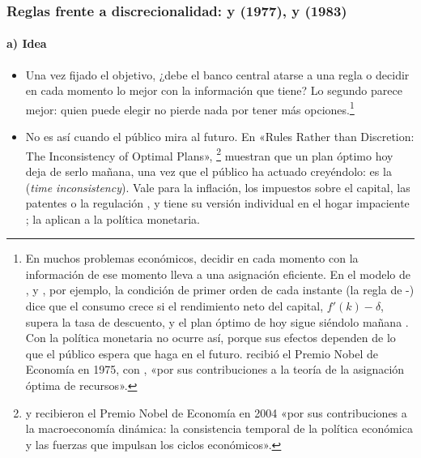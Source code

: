 \documentclass[11pt]{article}
\begin{document}
\subsubsection{Reglas frente a discrecionalidad:  y  (1977),  y  (1983)}\label{sec:kydland-prescott}

\paragraph{a) Idea}

\begin{itemize}
\item Una vez fijado el objetivo, ¿debe el banco central atarse a una regla o decidir en cada momento lo mejor con la información que tiene? Lo segundo parece mejor: quien puede elegir no pierde nada por tener más opciones.\footnote{En muchos problemas económicos, decidir en cada momento con la información de ese momento lleva a una asignación eficiente. En el modelo de ,  y , por ejemplo, la condición de primer orden de cada instante (la regla de -) dice que el consumo crece si el rendimiento neto del capital, $f'(k)-\delta$, supera la tasa de descuento, y el plan óptimo de hoy sigue siéndolo mañana . Con la política monetaria no ocurre así, porque sus efectos dependen de lo que el público espera que haga en el futuro.  recibió el Premio Nobel de Economía en 1975, con , «por sus contribuciones a la teoría de la asignación óptima de recursos»\nocite{NobelPrize1975Koopmans}.}
\item No es así cuando el público mira al futuro. En «Rules Rather than Discretion: The Inconsistency of Optimal Plans», \textcite{KydlandPrescott1977Rules}\footnote{ y  recibieron el Premio Nobel de Economía en 2004 «por sus contribuciones a la macroeconomía dinámica: la consistencia temporal de la política económica y las fuerzas que impulsan los ciclos económicos»\nocite{Nobel2004KydlandPrescott}.} muestran que un plan óptimo hoy deja de serlo mañana, una vez que el público ha actuado creyéndolo: es la  (\emph{time inconsistency}). Vale para la inflación, los impuestos sobre el capital, las patentes o la regulación , y tiene su versión individual en el hogar impaciente ; \textcite{BarroGordon1983Positive} la aplican a la política monetaria.

\end{itemize}
\end{document}

